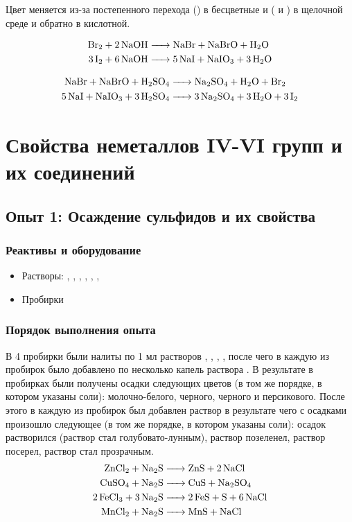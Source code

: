\documentclass[a4paper, 12pt]{article}
\begin{document}
Цвет меняется из-за постепенного перехода  () в бесцветные  и  ( и ) в щелочной среде и обратно в кислотной.

\begin{align}
	\ce{Br2 + 2NaOH &-> NaBr + NaBrO + H2O}\\
	\ce{3I2 + 6NaOH &-> 5NaI + NaIO3 + 3H2O}
\end{align}

\begin{align}
	\ce{NaBr + NaBrO + H2SO4 &-> Na2SO4 + H2O + Br2}\\
	\ce{5NaI + NaIO3 + 3H2SO4 &-> 3Na2SO4 + 3H2O + 3I2}
\end{align}

\newpage


\section{Свойства неметаллов IV-VI групп и их соединений}

\subsection{Опыт 1: Осаждение сульфидов и их свойства}

\subsubsection{Реактивы и оборудование}

\begin{itemize}
	\item Растворы: , , , , , , 
	
	\item Пробирки
\end{itemize}

\subsubsection{Порядок выполнения опыта}

В 4 пробирки были налиты по 1 мл растворов , , , , после чего в каждую из пробирок было добавлено по несколько капель раствора . В результате в пробирках были получены осадки следующих цветов (в том же порядке, в котором указаны соли): молочно-белого, черного, черного и персикового. После этого в каждую из пробирок был добавлен раствор  в результате чего с осадками произошло следующее  (в том же порядке, в котором указаны соли): осадок растворился (раствор стал голубовато-лунным), раствор позеленел, раствор посерел, раствор стал прозрачным.
\begin{align}
	\ce{ZnCl2 + Na2S &-> ZnS + 2 NaCl}\\
	\ce{CuSO4 + Na2S &-> CuS + Na2SO4}\\
	\ce{2FeCl3 + 3Na2S &-> 2 FeS + S + 6 NaCl}\\
	\ce{MnCl2 + Na2S &->  MnS + NaCl}
\end{align}
\end{document}
